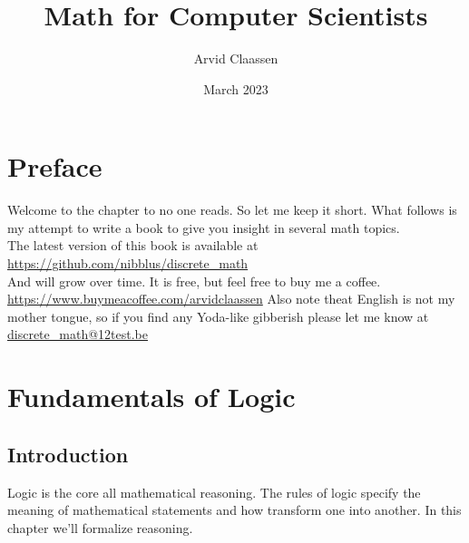 \documentclass[10pt,a4paper,draft,titlepage,onecolumn]{book}
\author{Arvid Claassen}
\date{March 2023}
\title{Math for Computer Scientists}
\begin{document}
\maketitle
\tableofcontents
\chapter*{Preface}
Welcome to the chapter to no one reads. So let me keep it short.
What follows is my attempt to write a book to give you insight in several math topics. \\
The latest version of this book is available at \url{https://github.com/nibblus/discrete_math}\\ And will grow over time. 
It is free, but feel free to buy me a coffee.  \url{https://www.buymeacoffee.com/arvidclaassen}
Also note theat English is not my mother tongue, so if you find any Yoda-like gibberish please let me know at \url{discrete_math@12test.be}




\chapter{Fundamentals of Logic}
\section*{Introduction}
Logic is the core all mathematical reasoning. The rules of logic specify the meaning of mathematical statements and how transform one into another. 
In this chapter we'll formalize reasoning.
\end{document}
